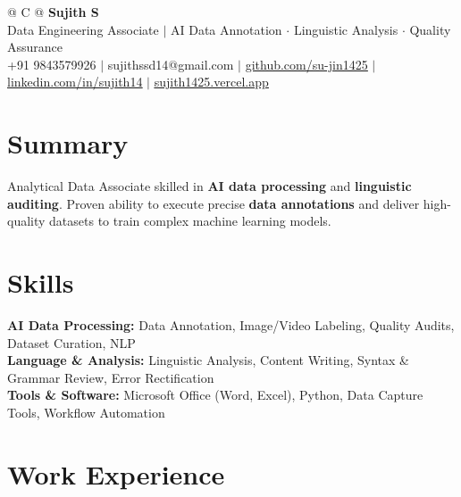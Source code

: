 \documentclass[a4paper,10pt]{article}
\newcommand{\ulink}[2]{\href{#1}{\uline{#2}}}
\begin{document}
\pagestyle{empty}

\begin{tabularx}{\linewidth}{@{} C @{}}
{\color[HTML]{000000}\fontsize{30}{35}\selectfont\bfseries Sujith S} \\[5pt]
{\fontsize{10.5}{12.5}\selectfont\color[HTML]{3A3A3A}
Data Engineering Associate $|$ AI Data Annotation $\cdot$ Linguistic Analysis $\cdot$ Quality Assurance} \\[6pt]
{\fontsize{9.5}{11.5}\selectfont\textcolor[HTML]{3A3A3A}{+91 9843579926 $|$ sujithssd14@gmail.com $|$ \ulink{https://github.com/su-jin1425}{github.com/su-jin1425} $|$ \ulink{https://linkedin.com/in/sujith14}{linkedin.com/in/sujith14} $|$ \ulink{https://sujith1425.vercel.app}{sujith1425.vercel.app}}}
\end{tabularx}

\vspace{2pt}

\section{Summary}
\vspace{3pt}
{\color[HTML]{0A0A0A}\fontsize{11}{14}\selectfont
Analytical Data Associate skilled in \textbf{AI data processing} and \textbf{linguistic auditing}. Proven ability to execute precise \textbf{data annotations} and deliver high-quality datasets to train complex machine learning models.}

\vspace{2pt}

\section{Skills}
\vspace{3pt}
{\color[HTML]{0A0A0A}\fontsize{11}{14}\selectfont
\textbf{AI Data Processing:} Data Annotation, Image/Video Labeling, Quality Audits, Dataset Curation, NLP \\[2pt]
\textbf{Language \& Analysis:} Linguistic Analysis, Content Writing, Syntax \& Grammar Review, Error Rectification \\[2pt]
\textbf{Tools \& Software:} Microsoft Office (Word, Excel), Python, Data Capture Tools, Workflow Automation}

\vspace{2pt}

\section{Work Experience}
\vspace{2pt}
\end{document}
